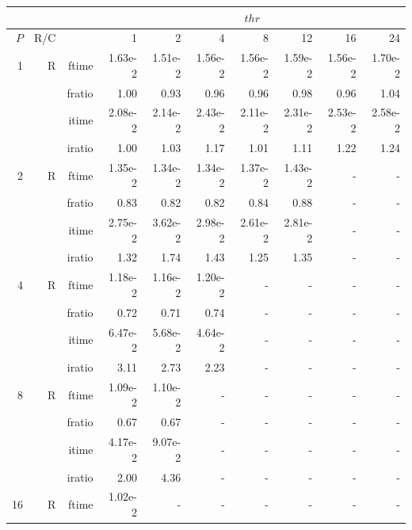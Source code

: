 \documentclass[a4paper]{article}
\begin{document}
\begin{table}[htbp]
\begin{center}
\begin{small}
\begin{tabular}{|r|r|r|r|r|r|r|r|r|r|}
\hline 
     & & & \multicolumn{7}{c|}{$thr$} \\ \hline
    $P$ & R/C &  & 1           & 2    & 4    & 8    & 12   & 16    & 24  \\ \hline\hline
   1 &  R &  ftime &   1.63e-2 &   1.51e-2 &   1.56e-2 &   1.56e-2 &   1.59e-2 &   1.56e-2 &   1.70e-2 \\
           &          & fratio &   1.00 &   0.93 &   0.96 &   0.96 &   0.98 &   0.96 &   1.04 \\
           &          & itime &   2.08e-2 &   2.14e-2 &   2.43e-2 &   2.11e-2 &   2.31e-2 &   2.53e-2 &   2.58e-2 \\
           &          & iratio &   1.00 &   1.03 &   1.17 &   1.01 &   1.11 &   1.22 &   1.24 \\\hline
   2 &  R &  ftime &   1.35e-2 &   1.34e-2 &   1.34e-2 &   1.37e-2 &   1.43e-2 &  - &  - \\
           &          & fratio &   0.83 &   0.82 &   0.82 &   0.84 &   0.88 &  - &  - \\
           &          & itime &   2.75e-2 &   3.62e-2 &   2.98e-2 &   2.61e-2 &   2.81e-2 &  - &  - \\
           &          & iratio &   1.32 &   1.74 &   1.43 &   1.25 &   1.35 &  - &  - \\\hline
   4 &  R &  ftime &   1.18e-2 &   1.16e-2 &   1.20e-2 &  - &  - &  - &  - \\
           &          & fratio &   0.72 &   0.71 &   0.74 &  - &  - &  - &  - \\
           &          & itime &   6.47e-2 &   5.68e-2 &   4.64e-2 &  - &  - &  - &  - \\
           &          & iratio &   3.11 &   2.73 &   2.23 &  - &  - &  - &  - \\\hline
   8 &  R &  ftime &   1.09e-2 &   1.10e-2 &  - &  - &  - &  - &  - \\
           &          & fratio &   0.67 &   0.67 &  - &  - &  - &  - &  - \\
           &          & itime &   4.17e-2 &   9.07e-2 &  - &  - &  - &  - &  - \\
           &          & iratio &   2.00 &   4.36 &  - &  - &  - &  - &  - \\\hline
   16 & R &  ftime &   1.02e-2 &  - &  - &  - &  - &  - &  - \\

\end{tabular}
\end{small}
\end{center}
\end{table}
\end{document}
